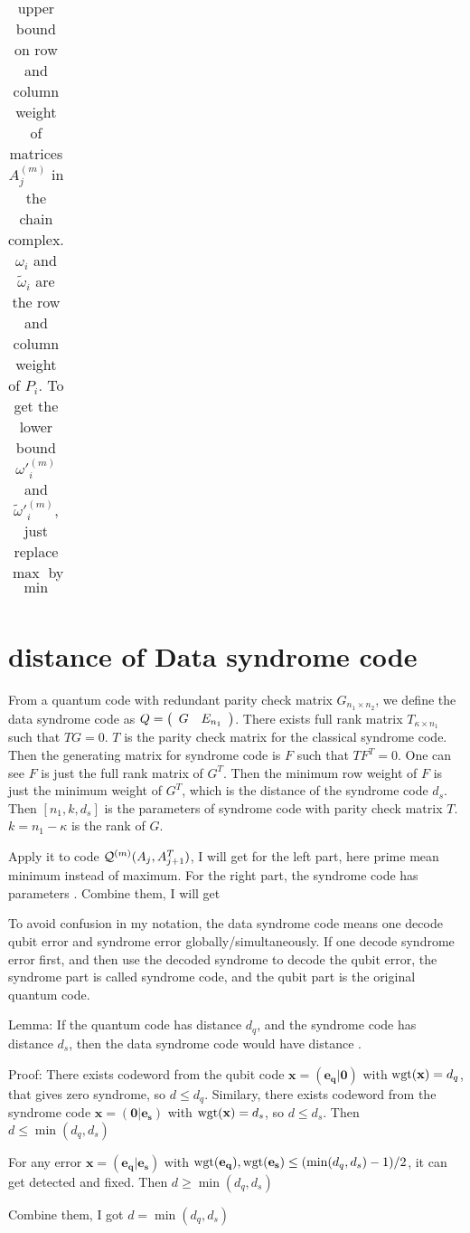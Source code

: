 \documentclass[aps,prb,12pt,tightenlines,%
notitlepage,longbibliography]{revtex4-1}
\begin{document}
\begin{table}[htbp]
\begin{tabular}[c]{c||c|c|c|c}
\end{tabular}
  \caption{upper bound on row and column weight of matrices $A^{(m)}_j$ in the chain complex. $\omega_i$ and $\tilde\omega_i$ are the row and column weight of $P_i$.  To get the lower bound $\omega'^{(m)}_i$ and $\tilde\omega'^{(m)}_i$, just replace $\max$ by $\min$
  }
  \label{tab:weight}
\end{table}


\section{distance of Data syndrome code}
From a quantum code with redundant parity check matrix $G_{n_1 \times n_2}$, we define the data syndrome code as $Q=\left( \begin{array}[c]{cc} G& E_{n_1} \end{array} \right)$. There exists full rank matrix $T_{\kappa \times n_1}$ such that $TG=0$. $T$ is the parity check matrix for the classical syndrome code. Then the generating matrix for syndrome code is $F$ such that $TF^T=0$. One can see $F$ is just the full rank matrix of $G^T$. Then the minimum row weight of $F$ is just the minimum weight of $G^T$, which is the distance of the syndrome code $d_s$. Then $[n_1,k,d_s]$ is the parameters of syndrome code with parity check matrix $T$. $k=n_1-\kappa$ is the rank of $G$.

Apply it to code $ {\cal Q}^{(m)}(A_{j},A_{j+1}^T)$, I will get  for the left part, here prime mean minimum instead of maximum. For the right part, the syndrome code has parameters  . Combine them, I will get  

To avoid confusion in my notation, the data syndrome code means one decode qubit error and syndrome error globally/simultaneously. If one decode syndrome error first, and then use the decoded syndrome to decode the qubit error,  the syndrome part is called syndrome code, and the qubit part is the original quantum code.

Lemma: If the quantum code has distance $d_q$, and the syndrome code has distance $d_s$, then the data syndrome code would have distance .

Proof: There exists codeword from the qubit code $\mathbf{x=(e_q | 0)}$ with $\mathop{\rm wgt} (\mathbf{x})=d_q$, that gives zero syndrome, so $d \leq d_q$. Similary, there exists codeword from the syndrome code $\mathbf{x=(0 | e_s)}$ with $\mathop{\rm wgt} (\mathbf{x})=d_s$, so $d \leq d_s$. Then $d\leq \min(d_q,d_s)$

For any error $\mathbf{x=(e_q | e_s)}$ with $\mathop{\rm wgt} (\mathbf{e_q}), \mathop{\rm wgt} (\mathbf{e_s}) \leq (\min(d_q,d_s)-1)/2$, it can get detected and fixed. Then $d\geq \min(d_q,d_s)$

Combine them, I got $d= \min(d_q,d_s)$





\end{document}
